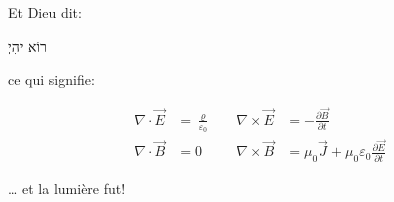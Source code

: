 \documentclass[preview,border=1cm]{standalone}
\begin{document}
Et Dieu dit:

\begin{center}
{\ezr\huge רוֹא יהִיְ}
\end{center}

ce qui signifie:

\begin{align*}
\nabla \cdot \vec{E} &= \frac{\varrho}{\varepsilon_0}
\quad & \nabla \times \vec{E} &= - \frac{\partial \vec{B}}{\partial t} \\
\nabla \cdot \vec{B} &= 0
\quad & \nabla \times \vec{B} &= \mu_{0}\vec{J}
+ \mu_{0}\varepsilon_{0}\frac{\partial \vec{E}}{\partial t}
\end{align*}

\begin{flushright}
\dots{} et la lumière fut!
\end{flushright}
\end{document}
